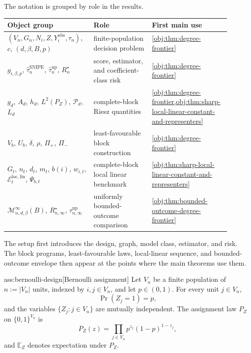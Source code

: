 The notation is grouped by role in the results.
\begin{center}
\small
\begin{tabular}{p{0.37\linewidth}p{0.25\linewidth}p{0.28\linewidth}}
\hline
Object group & Role & First main use \\
\hline
\((V_n,G_n,N_i,Z,Y_i^{\mathrm{obs}},\tau_n)\), \(c\), \((d,\beta,B,p)\)
& finite-population decision problem
& \cref{obj:thm:degree-frontier} \\
\(g_{i,\beta,p}\), \(\widehat\tau_n^{\mathrm{SNIPE}}\), \(\widehat\tau_n^{\mathrm{up}}\), \(R_n^\star\)
& score, estimator, and coefficient-class risk
& \cref{obj:thm:degree-frontier} \\
\(g_d\), \(A_d\), \(h_d\), \(L^2(P_Z)\), \(\mathcal P_d\), \(L_d\)
& complete-block Riesz quantities
& \cref{obj:thm:degree-frontier,obj:thm:sharp-local-linear-constant-and-representers} \\
\(V_b\), \(U_b\), \(\delta\), \(\rho\), \(\Pi_+\), \(\Pi_-\)
& least-favourable block construction
& \cref{obj:thm:degree-frontier} \\
\(G_t\), \(n_t\), \(d_t\), \(m_t\), \(b(i)\), \(w_{i,t}\), \(\mathcal E_t^{\mathrm{loc,lin}}\), \(\Psi_{b,t}\)
& complete-block local linear benchmark
& \cref{obj:thm:sharp-local-linear-constant-and-representers} \\
\(\mathcal M_{n,d,\beta}^{\infty}(B)\), \(R_{n,\infty}^{\star}\), \(\widehat\tau_{n,\infty}^{\mathrm{up}}\)
& uniformly bounded-outcome comparison
& \cref{obj:thm:bounded-outcome-degree-frontier} \\
\hline
\end{tabular}
\end{center}
The setup first introduces the design, graph, model class, estimator, and risk. The block programs, least-favourable laws, local-linear sequence, and bounded-outcome envelope then appear at the points where the main theorems use them.

\begin{assumptionv}{ass:bernoulli-design}[Bernoulli assignment]
Let \(V_n\) be a finite population of \(n:=|V_n|\) units, indexed by \(i,j\in V_n\), and let \(p\in(0,1)\). For every unit \(j\in V_n\),
\[
\Pr(Z_j=1)=p,
\]
and the variables \(\{Z_j:j\in V_n\}\) are mutually independent. The assignment law \(P_Z\) on \(\{0,1\}^{V_n}\) is
\[
P_Z(z)
=
\prod_{j\in V_n} p^{z_j}(1-p)^{1-z_j},
\]
and \(\mathbb E_Z\) denotes expectation under \(P_Z\).
\end{assumptionv}

